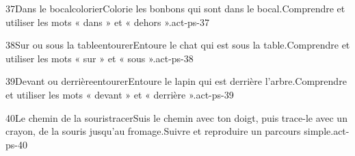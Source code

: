 \begin{activite}{37}{Dans le bocal}{colorier}{Colorie les bonbons qui sont {\otBold\color{otNavy}dans} le bocal.}{Comprendre et utiliser les mots « dans » et « dehors ».}{act-ps-37}
\end{activite}
\begin{activite}{38}{Sur ou sous la table}{entourer}{Entoure le chat qui est {\otBold\color{otNavy}sous} la table.}{Comprendre et utiliser les mots « sur » et « sous ».}{act-ps-38}
\end{activite}
\begin{activite}{39}{Devant ou derrière}{entourer}{Entoure le lapin qui est {\otBold\color{otNavy}derrière} l’arbre.}{Comprendre et utiliser les mots « devant » et « derrière ».}{act-ps-39}
\end{activite}
\begin{activite}{40}{Le chemin de la souris}{tracer}{Suis le chemin avec ton doigt, puis trace-le avec un crayon, de la souris jusqu’au fromage.}{Suivre et reproduire un parcours simple.}{act-ps-40}
\end{activite}
